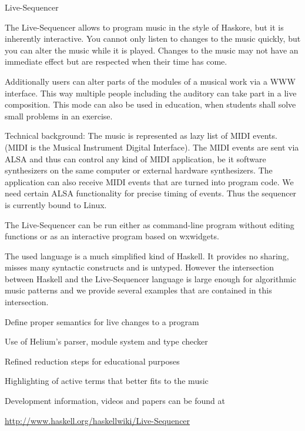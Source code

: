 \begin{hcarentry}{Live-Sequencer}
\makeheader

The Live-Sequencer allows to program music in the style of Haskore,
but it is inherently interactive.
You cannot only listen to changes to the music quickly,
but you can alter the music while it is played.
Changes to the music may not have an immediate effect
but are respected when their time has come.

Additionally users can alter parts of the modules of a musical work
via a WWW interface.
This way multiple people including the auditory
can take part in a live composition.
This mode can also be used in education,
when students shall solve small problems in an exercise.

Technical background:
The music is represented as lazy list of MIDI events.
(MIDI is the Musical Instrument Digital Interface).
The MIDI events are sent via ALSA and
thus can control any kind of MIDI application,
be it software synthesizers on the same computer
or external hardware synthesizers.
The application can also receive MIDI events
that are turned into program code.
We need certain ALSA functionality for precise timing of events.
Thus the sequencer is currently bound to Linux.

The Live-Sequencer can be run either as command-line program
without editing functions
or as an interactive program based on wxwidgets.

The used language is a much simplified kind of Haskell.
It provides no sharing, misses many syntactic constructs and is untyped.
However the intersection between Haskell and the Live-Sequencer language
is large enough for algorithmic music patterns
and we provide several examples that are contained in this intersection.


\FuturePlans
\begin{compactitem}
\item Define proper semantics for live changes to a program
\item Use of Helium's parser, module system and type checker
\item Refined reduction steps for educational purposes
\item Highlighting of active terms that better fits to the music
\end{compactitem}

\FurtherReading
Development information, videos and papers can be found at
\begin{center}
  \url{http://www.haskell.org/haskellwiki/Live-Sequencer}
\end{center}
\end{hcarentry}
